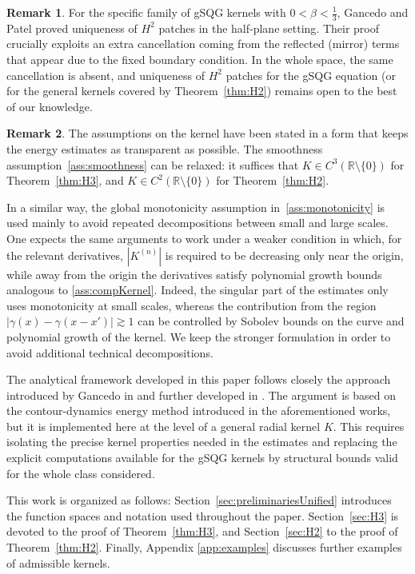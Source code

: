 \documentclass[a4paper]{amsart}
\theoremstyle{definition}
\newtheorem*{remark}{Remark}
\begin{document}
\begin{remark} \label{rmk:uniquenessH2}
For the specific family of gSQG kernels with $0<\beta<\frac{1}{3}$, Gancedo and Patel \cite{gancedo2021local} proved uniqueness of $H^2$
patches in the half‑plane setting. Their proof crucially exploits an extra cancellation coming from the reflected (mirror) terms that appear due to the fixed boundary condition. In the whole space, the same cancellation is absent, and uniqueness of $H^2$ patches for the gSQG equation (or for the general kernels covered by Theorem~\ref{thm:H2}) remains open to the best of our knowledge. 
\end{remark}

\begin{remark}
The assumptions on the kernel have been stated in a form that keeps the energy
estimates as transparent as possible. The smoothness assumption~\ref{ass:smoothness}
can be relaxed: it suffices that \(K\in C^3(\mathbb R\setminus\{0\})\) for
Theorem~\ref{thm:H3}, and \(K\in C^2(\mathbb R\setminus\{0\})\) for
Theorem~\ref{thm:H2}.

In a similar way, the global monotonicity assumption in~\ref{ass:monotonicity} is used mainly
to avoid repeated decompositions between small and large scales. One expects the same
arguments to work under a weaker condition in which, for the relevant derivatives,
\(|K^{(n)}|\) is required to be decreasing only near the origin, while away from the
origin the derivatives satisfy polynomial growth bounds analogous to
\ref{ass:compKernel}. Indeed, the singular part of the estimates only uses monotonicity
at small scales, whereas the contribution from the region
\(|\gamma(x)-\gamma(x-x')|\gtrsim 1\) can be controlled by Sobolev bounds on the curve
and polynomial growth of the kernel. We keep the stronger formulation in order to avoid
additional technical decompositions.
\end{remark}

The analytical framework developed in this paper follows closely the approach introduced by Gancedo in \cite{gancedo2008SQG} and further developed in \cite{gancedo2021local}. The argument is based on the contour-dynamics energy method introduced in the aforementioned works, but it is implemented here at the level of a general radial kernel \(K\). This requires isolating the precise kernel properties needed in the estimates and replacing the explicit computations available for the gSQG kernels by structural bounds valid for the whole class considered.

This work is organized as follows: Section~\ref{sec:preliminariesUnified} introduces the function spaces and notation used throughout the paper. Section~\ref{sec:H3} is devoted to the proof of Theorem~\ref{thm:H3}, and Section~\ref{sec:H2} to the proof of Theorem~\ref{thm:H2}. Finally, Appendix \ref{app:examples} discusses further examples of admissible kernels.
\end{document}
